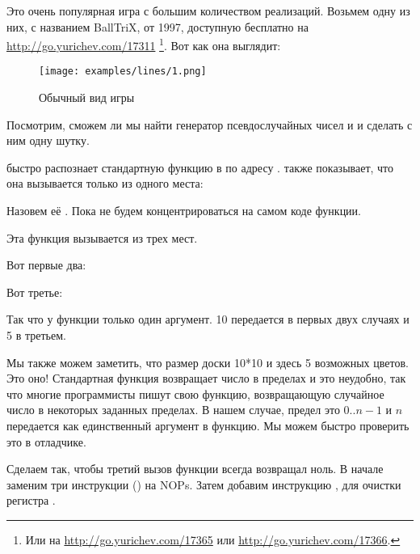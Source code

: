 ﻿\clearpage
{}
\label{chap:color_lines}

Это очень популярная игра с большим количеством реализаций.
Возьмем одну из них, с названием BallTriX, от 1997, доступную бесплатно на \url{http://go.yurichev.com/17311}
\footnote{Или на \url{http://go.yurichev.com/17365} или \url{http://go.yurichev.com/17366}.}.
Вот как она выглядит:

\begin{figure}[H]
\centering
\texttt{[image: examples/lines/1.png]}
\caption{Обычный вид игры}
\label{fig:lines_1}
\end{figure}

\clearpage
{}
Посмотрим, сможем ли мы найти генератор псевдослучайных чисел и и сделать с ним одну шутку.

\IDA быстро распознает стандартную функцию  в 
 по адресу .
\IDA также показывает, что она вызывается только из одного места:



Назовем её .
Пока не будем концентрироваться на самом коде функции.

Эта функция вызывается из трех мест.

Вот первые два:



Вот третье:



Так что у функции только один аргумент.
10 передается в первых двух случаях и 5 в третьем.

Мы также можем заметить, что размер доски 10*10 и здесь 5 возможных цветов.
Это оно!
Стандартная функция  возвращает число в пределах  и это неудобно, так что многие программисты пишут свою функцию,
возвращающую случайное число в некоторых заданных пределах.
В нашем случае, предел это $0..n-1$ и $n$ передается как
единственный аргумент в функцию.
Мы можем быстро проверить это в отладчике.

Сделаем так, чтобы третий вызов функции всегда возвращал ноль.
В начале заменим три инструкции () 
на \ac{NOP}s.
Затем добавим инструкцию , для очистки регистра \EAX.



